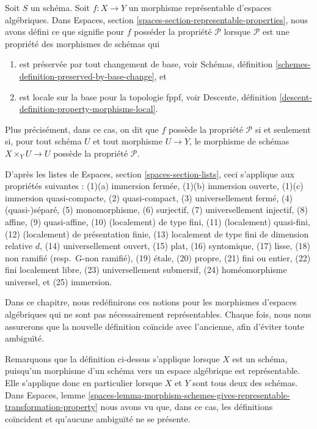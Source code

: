 \noindent
Soit $S$ un schéma.
Soit $f : X \to Y$ un morphisme représentable d'espaces algébriques. Dans
Espaces, section \ref{spaces-section-representable-properties},
nous avons défini ce que signifie pour $f$
posséder la propriété $\mathcal{P}$ lorsque $\mathcal{P}$ est une propriété
des morphismes de schémas qui
\begin{enumerate}
\item est préservée par tout changement de base,
voir Schémas, définition \ref{schemes-definition-preserved-by-base-change},
et
\item est locale sur la base pour la topologie fppf, voir
Descente, définition \ref{descent-definition-property-morphisms-local}.
\end{enumerate}
Plus précisément, dans ce cas, on dit que $f$ possède la propriété $\mathcal{P}$ si et seulement
si, pour tout schéma $U$ et tout morphisme $U \to Y$, le morphisme de schémas
$X \times_Y U \to U$ possède la propriété $\mathcal{P}$.

\medskip\noindent
D'après les listes de
Espaces, section \ref{spaces-section-lists},
ceci s'applique aux propriétés suivantes :
(1)(a) immersion fermée,
(1)(b) immersion ouverte,
(1)(c) immersion quasi-compacte,
(2) quasi-compact,
(3) universellement fermé,
(4) (quasi-)séparé,
(5) monomorphisme,
(6) surjectif,
(7) universellement injectif,
(8) affine,
(9) quasi-affine,
(10) (localement) de type fini,
(11) (localement) quasi-fini,
(12) (localement) de présentation finie,
(13) localement de type fini de dimension relative $d$,
(14) universellement ouvert,
(15) plat,
(16) syntomique,
(17) lisse,
(18) non ramifié (resp.\ G-non ramifié),
(19) \'etale,
(20) propre,
(21) fini ou entier,
(22) fini localement libre,
(23) universellement submersif,
(24) homéomorphisme universel, et
(25) immersion.

\medskip\noindent
Dans ce chapitre, nous redéfinirons ces notions pour les morphismes d'espaces
algébriques qui ne sont pas nécessairement représentables. Chaque fois, nous nous
assurerons que la nouvelle définition coïncide avec l'ancienne, afin d'éviter
toute ambiguïté.

\medskip\noindent
Remarquons que la définition ci-dessus s'applique lorsque $X$ est un schéma,
puisqu'un morphisme d'un schéma vers un espace algébrique est représentable.
Elle s'applique donc en particulier lorsque $X$ et $Y$ sont tous deux des schémas.
Dans
Espaces, lemme
\ref{spaces-lemma-morphism-schemes-gives-representable-transformation-property}
nous avons vu que, dans ce cas, les définitions
coïncident et qu'aucune ambiguïté ne se présente.

